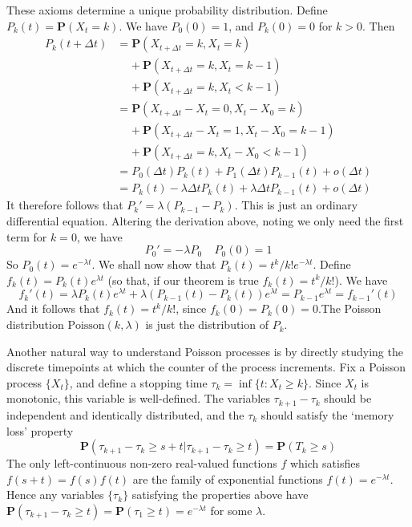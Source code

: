These axioms determine a unique probability distribution. Define $P_k(t) = \mathbf{P}(X_t = k)$. We have $P_0(0) = 1$, and $P_k(0) = 0$ for $k > 0$. Then
%
\begin{align*}
    P_k(t + \Delta t) &= \mathbf{P}(X_{t + \Delta t} = k, X_t = k)\\
    &\ \ \ \ \ + \mathbf{P}(X_{t + \Delta t} = k, X_t = k - 1)\\
    &\ \ \ \ \ + \mathbf{P}(X_{t + \Delta t} = k, X_t < k - 1)\\
    &= \mathbf{P}(X_{t + \Delta t} - X_t = 0, X_t - X_0 = k)\\
    &\ \ \ \ \ + \mathbf{P}(X_{t + \Delta t} - X_t = 1, X_t - X_0 = k-1)\\
    &\ \ \ \ \ + \mathbf{P}(X_{t + \Delta t} = k, X_t - X_0 < k - 1)\\
    &= P_0(\Delta t) P_k(t) + P_1(\Delta t) P_{k-1}(t) + o(\Delta t)\\
    &= P_k(t) - \lambda \Delta t P_k(t) + \lambda \Delta t P_{k-1}(t) + o(\Delta t)
\end{align*}
%
It therefore follows that $P_k' = \lambda(P_{k-1} - P_k)$. This is just an ordinary differential equation. Altering the derivation above, noting we only need the first term for $k = 0$, we have
%
\[ P_0' = - \lambda P_0\ \ \ \ \ P_0(0) = 1 \]
%
So $P_0(t) = e^{-\lambda t}$. We shall now show that $P_k(t) = t^k/k! e^{-\lambda t}$. Define $f_k(t) = P_k(t) e^{\lambda t}$ (so that, if our theorem is true $f_k(t) = t^k/k!$). We have
%
\[ f_k'(t) = \lambda P_k(t) e^{\lambda t} + \lambda (P_{k - 1}(t) - P_k(t)) e^{\lambda t} = P_{k - 1} e^{\lambda t} = f_{k - 1}'(t) \]
%
And it follows that $f_k(t) = t^k/k!$, since $f_k(0) = P_k(0) = 0$.The Poisson distribution $\text{Poisson}(k,\lambda)$ is just the distribution of $P_k$.

Another natural way to understand Poisson processes is by directly studying the discrete timepoints at which the counter of the process increments. Fix a Poisson process $\{ X_t \}$, and define a stopping time $\tau_k = \inf \{ t: X_t \geq k \}$. Since $X_t$ is monotonic, this variable is well-defined. The variables $\tau_{k+1} - \tau_k$ should be independent and identically distributed, and the $\tau_k$ should satisfy the `memory loss' property
%
\[ \mathbf{P}(\tau_{k+1} - \tau_k \geq s + t | \tau_{k+1} - \tau_k \geq t) = \mathbf{P}(T_k \geq s) \]
%
The only left-continuous non-zero real-valued functions $f$ which satisfies $f(s + t) = f(s) f(t)$ are the family of exponential functions $f(t) = e^{-\lambda t}$. Hence any variables $\{ \tau_k \}$ satisfying the properties above have $\mathbf{P}(\tau_{k+1} - \tau_k \geq t) = \mathbf{P}(\tau_1 \geq t) = e^{-\lambda t}$ for some $\lambda$.

